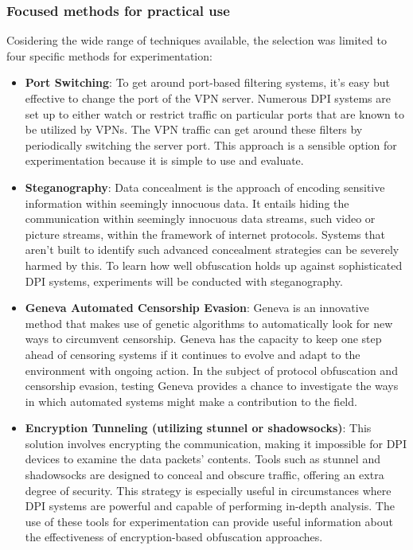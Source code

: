\documentclass[12pt, fleqn, a4paper]{article}
\begin{document}
\subsubsection{Focused methods for practical use}
Cosidering the wide range of techniques available, the selection was limited to four specific methods for experimentation:
\begin{itemize}
  \item \textbf{Port Switching}: To get around port-based filtering systems, it's easy but effective to change the port of the VPN server. Numerous DPI systems are set up to either watch or restrict traffic on particular ports that are known to be utilized by VPNs. The VPN traffic can get around these filters by periodically switching the server port. This approach is a sensible option for experimentation because it is simple to use and evaluate. \citep{crawford}
  \item \textbf{Steganography}: Data concealment is the approach of encoding sensitive information within seemingly innocuous data. It entails hiding the communication within seemingly innocuous data streams, such video or picture streams, within the framework of internet protocols. Systems that aren't built to identify such advanced concealment strategies can be severely harmed by this. To learn how well obfuscation holds up against sophisticated DPI systems, experiments will be conducted with steganography. \citep{osisteg}
  \item \textbf{Geneva Automated Censorship Evasion}: Geneva is an innovative method that makes use of genetic algorithms to automatically look for new ways to circumvent censorship. Geneva has the capacity to keep one step ahead of censoring systems if it continues to evolve and adapt to the environment with ongoing action. In the subject of protocol obfuscation and censorship evasion, testing Geneva provides a chance to investigate the ways in which automated systems might make a contribution to the field. \citep{Geneva}
  \item \textbf{Encryption Tunneling (utilizing stunnel or shadowsocks)}: This solution involves encrypting the communication, making it impossible for DPI devices to examine the data packets' contents. Tools such as stunnel and shadowsocks are designed to conceal and obscure traffic, offering an extra degree of security. This strategy is especially useful in circumstances where DPI systems are powerful and capable of performing in-depth analysis. The use of these tools for experimentation can provide useful information about the effectiveness of encryption-based obfuscation approaches. \citep{shadowsocks2}
\end{itemize}
\end{document}

